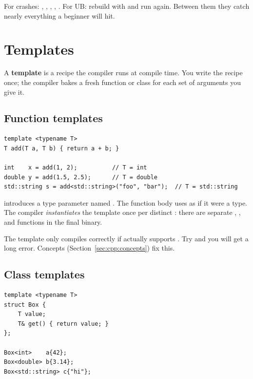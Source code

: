\begin{idea}
For crashes: , , , ,
. For UB: rebuild with
 and run again. Between them they
catch nearly everything a beginner will hit.
\end{idea}

\section{Templates}
\label{sec:cpp:templates}

A \textbf{template} is a recipe the compiler runs at compile time.
You write the recipe once; the compiler bakes a fresh function or
class for each set of arguments you give it.

\subsection{Function templates}

\begin{lstlisting}
template <typename T>
T add(T a, T b) { return a + b; }

int    x = add(1, 2);          // T = int
double y = add(1.5, 2.5);      // T = double
std::string s = add<std::string>("foo", "bar");  // T = std::string
\end{lstlisting}

 introduces a type parameter named . The
function body uses  as if it were a type. The compiler
\emph{instantiates} the template once per distinct : there
are separate , , and
 functions in the final binary.

The template only compiles correctly if  actually supports
. Try  and you will get a long
error. Concepts (Section~\ref{sec:cpp:concepts}) fix this.

\subsection{Class templates}

\begin{lstlisting}
template <typename T>
struct Box {
    T value;
    T& get() { return value; }
};

Box<int>    a{42};
Box<double> b{3.14};
Box<std::string> c{"hi"};
\end{lstlisting}


